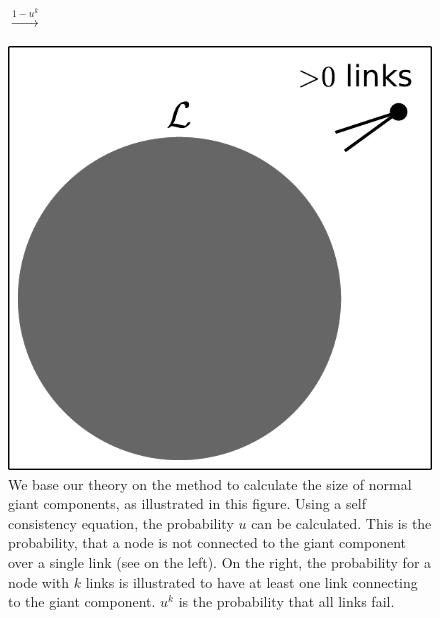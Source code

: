 \documentclass[aps, pre, onecolumn, a4paper, floatfix]{revtex4}
\begin{document}
\begin{figure}[htb]
\begin{minipage}[b]{0.18\linewidth}
\begin{center}
    \end{center}
  \end{minipage}
  \begin{minipage}[b]{0.07\linewidth}
    \begin{center}
      {\large $\xrightarrow{1-u^k}$}\\
      \vspace{15mm}
    \end{center}
  \end{minipage}
  \begin{minipage}[b]{0.18\linewidth}
    \begin{center}
      \includegraphics[width=0.99\columnwidth]{sets_gc_gck.pdf}
    \end{center}
  \end{minipage}
    \caption{We base our theory on the method to calculate the size of 
    normal giant components, as illustrated in this figure. Using a self 
    consistency equation, the probability $u$ can be calculated. This is the 
    probability, that a node is not connected to the giant component over a 
    single link (see on the left). On the right, the probability for a node 
    with $k$ links is illustrated to have at least one link connecting to 
    the giant component. $u^k$ is the probability that all links fail.}
    \label{fig:gc}
\end{figure}
\end{document}

